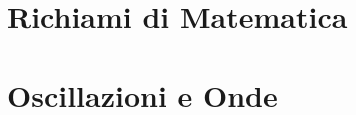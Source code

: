 \documentclass[a4paper, 11pt]{book}
\numberwithin{equation}{chapter} %
\begin{document}






%
\part{Richiami di Matematica}
%
\part{Oscillazioni e Onde}


\appendix


\DeclareEmphSequence{\itshape}
\printbibliography
\end{document}
